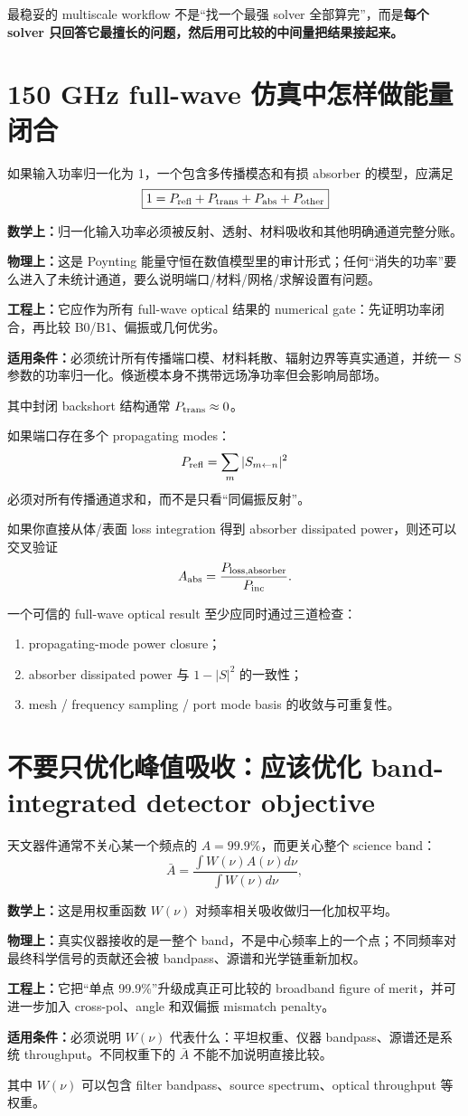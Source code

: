 \documentclass[11pt,a4paper,openany]{ctexrep}
\newcommand{\formulaexplain}[4]{%
\begin{formulaguidebox}
\textbf{\color{KidBlue}数学上：}#1\par
\textbf{\color{KidTeal}物理上：}#2\par
\textbf{\color{KidGold!55!black}工程上：}#3\par
\textbf{\color{KidRed}适用条件：}#4
\end{formulaguidebox}%
}
\begin{document}
\begin{intuitionbox}
最稳妥的 multiscale workflow 不是“找一个最强 solver 全部算完”，而是\textbf{每个 solver 只回答它最擅长的问题，然后用可比较的中间量把结果接起来。}
\end{intuitionbox}

\section{150 GHz full-wave 仿真中怎样做能量闭合}

如果输入功率归一化为 1，一个包含多传播模态和有损 absorber 的模型，应满足
\[
\boxed{
1=P_{\rm refl}+P_{\rm trans}+P_{\rm abs}+P_{\rm other}
}
\]
\formulaexplain
{归一化输入功率必须被反射、透射、材料吸收和其他明确通道完整分账。}
{这是 Poynting 能量守恒在数值模型里的审计形式；任何“消失的功率”要么进入了未统计通道，要么说明端口/材料/网格/求解设置有问题。}
{它应作为所有 full-wave optical 结果的 numerical gate：先证明功率闭合，再比较 B0/B1、偏振或几何优劣。}
{必须统计所有传播端口模、材料耗散、辐射边界等真实通道，并统一 S 参数的功率归一化。倏逝模本身不携带远场净功率但会影响局部场。}
其中封闭 backshort 结构通常 $P_{\rm trans}\approx0$。

如果端口存在多个 propagating modes：
\[
P_{\rm refl}=\sum_m |S_{m\leftarrow n}|^2
\]
必须对所有传播通道求和，而不是只看“同偏振反射”。

如果你直接从体/表面 loss integration 得到 absorber dissipated power，则还可以交叉验证
\[
A_{\rm abs}=\frac{P_{\rm loss,absorber}}{P_{\rm inc}}.
\]

\begin{checkpointbox}
一个可信的 full-wave optical result 至少应同时通过三道检查：
\begin{enumerate}
  \item propagating-mode power closure；
  \item absorber dissipated power 与 $1-|S|^2$ 的一致性；
  \item mesh / frequency sampling / port mode basis 的收敛与可重复性。
\end{enumerate}
\end{checkpointbox}

\section{不要只优化峰值吸收：应该优化 band-integrated detector objective}

天文器件通常不关心某一个频点的 $A=99.9\%$，而更关心整个 science band：
\[
\bar A=\frac{\int W(\nu)A(\nu)d\nu}{\int W(\nu)d\nu},
\]
\formulaexplain
{这是用权重函数 $W(\nu)$ 对频率相关吸收做归一化加权平均。}
{真实仪器接收的是一整个 band，不是中心频率上的一个点；不同频率对最终科学信号的贡献还会被 bandpass、源谱和光学链重新加权。}
{它把“单点 99.9\%”升级成真正可比较的 broadband figure of merit，并可进一步加入 cross-pol、angle 和双偏振 mismatch penalty。}
{必须说明 $W(\nu)$ 代表什么：平坦权重、仪器 bandpass、源谱还是系统 throughput。不同权重下的 $\bar A$ 不能不加说明直接比较。}
其中 $W(\nu)$ 可以包含 filter bandpass、source spectrum、optical throughput 等权重。
\end{document}

